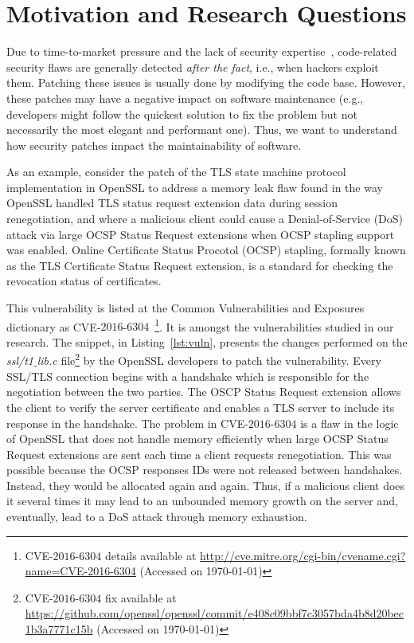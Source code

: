 \documentclass[10pt,conference]{IEEEtran}
\makeatletter
\newcommand\footnoteref[1]{\protected@xdef\@thefnmark{\ref{#1}}\@footnotemark}
\makeatother
\begin{document}
\section{Motivation and Research Questions}\label{sec:motivation}
%
Due to time-to-market pressure and the lack of security expertise~\cite{8077802}, code-related
security flaws are generally detected \textit{after the fact}, i.e., when
hackers exploit them. Patching these issues is usually done by modifying the code base. 
However, these patches may have a
negative impact on software maintenance (e.g., developers might follow the
quickest solution to fix the problem but not necessarily the most elegant and
performant one). Thus, we want to understand how security patches impact
the maintainability of software. 

As an example, consider the patch of the TLS state machine protocol implementation
in OpenSSL\footnoteref{openssl} to address a memory leak flaw found in the way 
OpenSSL handled TLS status request extension data during session 
renegotiation, and where a malicious client could cause a Denial-of-Service
(DoS) attack via large OCSP Status Request extensions when OCSP stapling support
was enabled. Online Certificate Status Procotol (OCSP) stapling, formally known as the TLS Certificate 
Status Request extension, is a standard for checking the revocation status of
certificates. 

This vulnerability is listed at the Common
Vulnerabilities and Exposures dictionary as CVE-$2016$-$6304$~\footnote{CVE-$2016$-$6304$
details available at \url{http://cve.mitre.org/cgi-bin/cvename.cgi?name=CVE-2016-6304}
(Accessed on \today{})}. It is amongst the vulnerabilities studied in our
research. The snippet, in Listing~\ref{lst:vuln}, presents the changes performed on the
\emph{ssl/t1$\_$lib.c} file\footnote{CVE-$2016$-$6304$ fix available  at
\url{https://github.com/openssl/openssl/commit/e408c09bbf7c3057bda4b8d20bec1b3a7771c15b}
(Accessed on \today{})} by the OpenSSL developers to patch the vulnerability. 
Every SSL/TLS connection begins with a handshake 
which is responsible for the negotiation between the two parties. 
The OSCP Status Request extension allows the client to verify
the server certificate and enables a TLS server to include
its response in the handshake. The problem in CVE-$2016$-$6304$
is a flaw in the logic of OpenSSL that does not handle memory efficiently
when large OCSP Status Request extensions are sent each time a client 
requests renegotiation. This was possible because the OCSP responses IDs 
were not released between handshakes. Instead, they would be allocated 
again and again. Thus, if a malicious client does it several times it may lead to 
an unbounded memory growth on the server and, eventually, lead to a 
DoS attack through memory exhaustion. 
\end{document}
